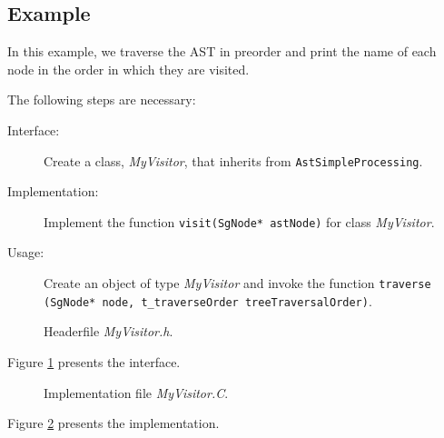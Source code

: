 \subsection{Example}

In this example, we traverse the AST in preorder and print the name of
each node in the order in which they are visited.

The following steps are necessary:

\begin{description}
   \item[Interface:] Create a class, {\em MyVisitor}, that inherits from {\tt AstSimpleProcessing}.
   \item[Implementation:] Implement the function {\tt visit(SgNode* astNode)} for class {\em MyVisitor}.
   \item[Usage:] Create an object of type {\em MyVisitor} and invoke the function 
     {\tt traverse (SgNode* node, t\_traverseOrder treeTraversalOrder)}.
\end{description}

\begin{figure}
\begin{latexonly}
   
\end{latexonly}

\begin{htmlonly}
   
\end{htmlonly}
\caption{Headerfile {\em MyVisitor.h}.}
\label{AstProcessing:myvisitor1}
\end{figure}

Figure \ref{AstProcessing:myvisitor1} presents the interface.

\begin{figure}
\begin{latexonly}
   
\end{latexonly}

\begin{htmlonly}
   
\end{htmlonly}
\caption{Implementation file {\em MyVisitor.C}.}
\label{AstProcessing:myvisitor2}
\end{figure}

Figure \ref{AstProcessing:myvisitor2} presents the implementation.

